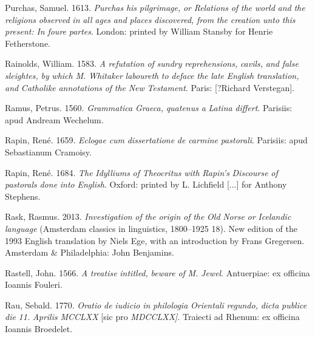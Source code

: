 \documentclass[output=paper]{langsci/langscibook}
\begin{document}
Purchas, Samuel. 1613. \textit{Purchas} \textit{his} \textit{pilgrimage,} \textit{or} \textit{Relations} \textit{of} \textit{the} \textit{world} \textit{and} \textit{the} \textit{religions} \textit{observed} \textit{in} \textit{all} \textit{ages} \textit{and} \textit{places} \textit{discovered,} \textit{from} \textit{the} \textit{creation} \textit{unto} \textit{this} \textit{present:} \textit{In} \textit{foure} \textit{partes}. London: printed by William Stansby for Henrie Fetherstone.

Rainolds, William. 1583. \textit{A} \textit{refutation} \textit{of} \textit{sundry} \textit{reprehensions,} \textit{cavils,} \textit{and} \textit{false} \textit{sleightes,} \textit{by} \textit{which} \textit{M.} \textit{Whitaker} \textit{laboureth} \textit{to} \textit{deface} \textit{the} \textit{late} \textit{English} \textit{translation,} \textit{and} \textit{Catholike} \textit{annotations} \textit{of} \textit{the} \textit{New} \textit{Testament}. Paris: [?Richard Verstegan].

Ramus, Petrus. 1560. \textit{Grammatica} \textit{Graeca,} \textit{quatenus} \textit{a} \textit{Latina} \textit{differt}. Parisiis: apud Andream Wechelum.

Rapin, René. 1659. \textit{Eclogae} \textit{cum} \textit{dissertatione} \textit{de} \textit{carmine} \textit{pastorali}. Parisiis: apud Sebastianum Cramoisy.

Rapin, René. 1684. \textit{The} \textit{Idylliums} \textit{of} \textit{Theocritus} \textit{with} \textit{Rapin’s} \textit{Discourse} \textit{of} \textit{pastorals} \textit{done} \textit{into} \textit{English}. Oxford: printed by L. Lichfield [...] for Anthony Stephens.

Rask, Rasmus. 2013. \textit{Investigation} \textit{of} \textit{the} \textit{origin} \textit{of} \textit{the} \textit{Old} \textit{Norse} \textit{or} \textit{Icelandic} \textit{language} (Amsterdam classics in linguistics, 1800–1925 18). New edition of the 1993 English translation by Niels Ege, with an introduction by Frans Gregersen. Amsterdam \& Philadelphia: John Benjamins.

Rastell, John. 1566. \textit{A} \textit{treatise} \textit{intitled,} \textit{beware} \textit{of} \textit{M.} \textit{Jewel}. Antuerpiae: ex officina Ioannis Fouleri.

Rau, Sebald. 1770. \textit{Oratio} \textit{de} \textit{iudicio} \textit{in} \textit{philologia} \textit{Orientali} \textit{regundo,} \textit{dicta} \textit{publice} \textit{die} \textit{11.} \textit{Aprilis} \textit{MCCLXX} [sic pro \textit{MDCCLXX]}. Traiecti ad Rhenum: ex officina Ioannis Broedelet.
\end{document}

